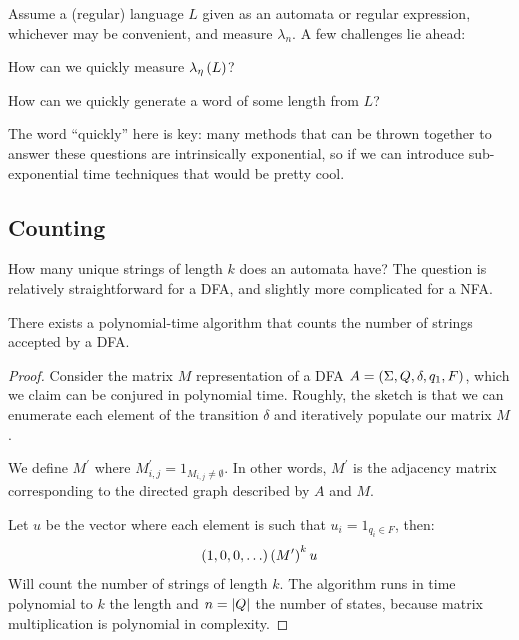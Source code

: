 \documentclass[12pt]{article}
\begin{document}
Assume a (regular) language \(L\) given as an automata or regular
expression, whichever may be convenient, and measure \(\lambda_{n}\).
A few challenges lie ahead:

\begin{question}
  How can we quickly measure \(\lambda_{\eta}\left(L\right)\)?
\end{question}

\begin{question}
  How can we quickly generate a word of some length from \(L\)?
\end{question}

The word ``quickly'' here is key:
many methods that can be thrown together to answer these questions
are intrinsically exponential,
so if we can introduce sub-exponential time techniques
that would be pretty cool.


\subsection{Counting}
How many unique strings of length \(k\) does an automata have?
The question is relatively straightforward for a DFA,
and slightly more complicated for a NFA.

\begin{theorem}
  There exists a polynomial-time algorithm that counts the number of strings
  accepted by a DFA.
\end{theorem}
\begin{proof}
  Consider the matrix \(M\) representation of a
  DFA \(A = \left(\Sigma, Q, \delta, q_1, F\right)\),
  which we claim can be conjured in polynomial time.
  Roughly, the sketch is that we can enumerate each element
  of the transition \(\delta\) and iteratively populate our matrix \(M\).

  We define \(M^\prime\)
  where \(M^\prime _{i, j} = 1_{M_{i, j} \neq \emptyset}\).
  In other words, \(M^\prime\) is the adjacency
  matrix corresponding to the directed graph described by \(A\) and \(M\).

  Let \(u\) be the vector where each element is such that
  \(u_i = 1_{q_i \in F}\), then:
  \begin{align*}
    \left(1, 0, 0, \ldots\right) \left(M^\prime\right)^k u
  \end{align*}
  Will count the number of strings of length \(k\).
  The algorithm runs in time polynomial to \(k\) the length
  and \(n = \left\lvert Q\right\rvert\) the number of states,
  because matrix multiplication is polynomial in complexity.
\end{proof}
\end{document}
